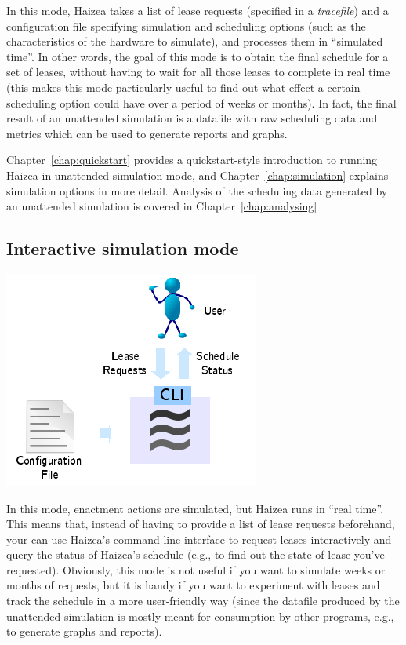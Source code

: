 In this mode, Haizea takes a list of lease requests (specified in a \emph{tracefile}) and a configuration file specifying simulation and scheduling options (such as the characteristics of the hardware to simulate), and processes them in ``simulated time''. In other words, the goal of this mode is to obtain the final schedule for a set of leases, without having to wait for all those leases to complete in real time (this makes this mode particularly useful to find out what effect a certain scheduling option could have over a period of weeks or months). In fact, the final result of an unattended simulation is a datafile with raw scheduling data and metrics which can be used to generate reports and graphs. 

Chapter~\ref{chap:quickstart} provides a quickstart-style introduction to running Haizea in unattended simulation mode, and Chapter~\ref{chap:simulation} explains simulation options in more detail. Analysis of the scheduling data generated by an unattended simulation is covered in Chapter~\ref{chap:analysing} 

\subsection{Interactive simulation mode}

\begin{center}
\includegraphics{images/mode_interactive_simulation.png}
\end{center}

In this mode, enactment actions are simulated, but Haizea runs in ``real time''. This means that, instead of having to provide a list of lease requests beforehand, your can use Haizea's command-line interface to request leases interactively and query the status of Haizea's schedule (e.g., to find out the state of lease you've requested). Obviously, this mode is not useful if you want to simulate weeks or months of requests, but it is handy if you want to experiment with leases and track the schedule in a more user-friendly way (since the datafile produced by the unattended simulation is mostly meant for consumption by other programs, e.g., to generate graphs and reports).

